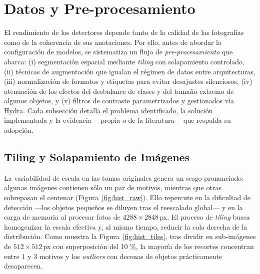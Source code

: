 \section{Datos y Pre-procesamiento}\label{sec:datos}

El rendimiento de los detectores depende tanto de la calidad de las fotografías como de la coherencia de sus anotaciones.
Por ello, antes de abordar la configuración de modelos, se sistematiza un flujo de \textit{pre-procesamiento} que abarca:
(i) segmentación espacial mediante \emph{tiling} con solapamiento controlado,
(ii) técnicas de augmentación que igualan el régimen de datos entre arquitecturas,
(iii) normalización de formatos y etiquetas para evitar desajustes silenciosos, (iv) atenuación de los efectos del desbalance de clases y del tamaño extremo de algunos objetos, y
(v) filtros de contraste parametrizados y gestionados vía Hydra.
Cada subsección detalla el problema identificado, la solución implementada y la evidencia —propia o de la literatura— que respalda su adopción.


\subsection{Tiling y Solapamiento de Imágenes}\label{ssec:tiling}

La variabilidad de escala en las tomas originales genera un sesgo pronunciado: algunas imágenes contienen sólo un par de motivos, mientras que otras sobrepasan el centenar (Figura~\ref{fig:hist_raw}).
Ello repercute en la dificultad de detección —los objetos pequeños se diluyen tras el reescalado global— y en la carga de memoria al procesar fotos de \(4288\times2848\)\,px.
El proceso de \emph{tiling} busca homogenizar la escala efectiva y, al mismo tiempo, reducir la cola derecha de la distribución.
Como muestra la Figura~\ref{fig:hist_tiles}, tras dividir en sub‐imágenes de \(512\times512\)\,px con superposición del 10 \%, la mayoría de los recortes concentran entre 1 y 3 motivos y los \emph{outliers} con decenas de objetos prácticamente desaparecen.


